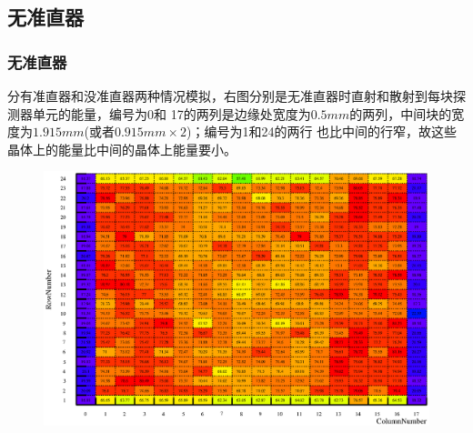 \documentclass{beamer}
\newcommand{\liuhao}{\fontsize{7.875pt}{\baselineskip}\selectfont}
\begin{document}
\begin{CJK*}{UTF8}{gkai}
  \subsection{无准直器}
  \begin{frame}\frametitle{无准直器}
    \begin{minipage}[t]{0.3\textwidth}
      \liuhao
      分有准直器和没准直器两种情况模拟，右图分别是无准直器时直射和散射到每块探测器单元的能量，编号为0和
      17的两列是边缘处宽度为$0.5mm$的两列，中间块的宽度为$1.915mm$(或者$0.915mm\times 2$)；编号为1和24的两行
      也比中间的行窄，故这些晶体上的能量比中间的晶体上能量要小。
    \end{minipage}
    \begin{minipage}[t]{0.7\textwidth}
      \vskip -0.5cm
      \begin{figure}[ht]
        \centering
        \includegraphics[width=\textwidth,height=0.58\textwidth]{WithoutCollimatorDirectEnergyMerged.eps}


\end{figure}
\end{minipage}
\end{frame}
\end{CJK*}
\end{document}
